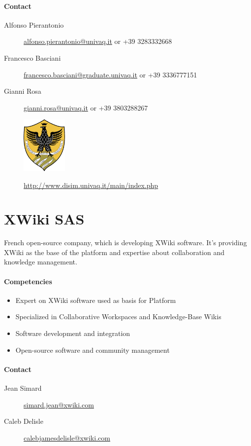 \documentclass{learnpad}
\begin{document}
\paragraph{Contact}
\begin{description}
	\item[Alfonso Pierantonio] \href{mailto:alfonso.pierantonio@univaq.it}{alfonso.pierantonio@univaq.it} or +39 3283332668
	\item[Francesco Basciani] \href{mailto:francesco.basciani@graduate.univaq.it}{francesco.basciani@graduate.univaq.it} or +39 3336777151
	\item[Gianni Rosa] \href{mailto:gianni.rosa@univaq.it}{gianni.rosa@univaq.it} or +39 3803288267
\end{description}

\begin{figure}[!htp]
	\centering
	\includegraphics[width=6em,keepaspectratio]{figures/univaq.png}\par
	\url{http://www.disim.univaq.it/main/index.php}
\end{figure}

\section{XWiki SAS}
French open-source company, which is developing XWiki software.  It's providing
XWiki as the base of the \learnpad platform and expertise about collaboration
and knowledge management.

\paragraph{Competencies}
\begin{itemize}
	\item Expert on XWiki software used as basis for \learnpad Platform
	\item Specialized in Collaborative Workspaces and Knowledge-Base Wikis
	\item Software development and integration
	\item Open-source software and community management
\end{itemize}

\paragraph{Contact}
\begin{description}
	\item[Jean Simard] \href{mailto:simard.jean@xwiki.com}{simard.jean@xwiki.com}
	\item[Caleb Delisle] \href{mailto:calebjamesdelisle@xwiki.com}{calebjamesdelisle@xwiki.com}
\end{description}
\end{document}
